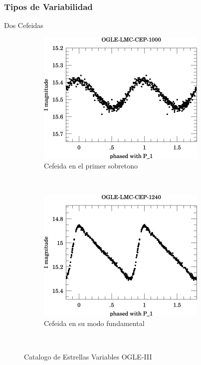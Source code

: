 \documentclass{beamer}
\begin{document}
\begin{frame}
  \frametitle{Tipos de Variabilidad}
  Dos Cefeidas
  \begin{figure}
    \centering
    \begin{subfigure}[b]{0.4\textwidth}
      \includegraphics[width=\textwidth]{./img/OGLE-LMC-CEP-1000_1.jpg}
      \caption{Cefeida en el primer sobretono}
      \label{fig:gull}
    \end{subfigure}%
    ~ %
    \begin{subfigure}[b]{0.4\textwidth}
      \includegraphics[width=\textwidth]{./img/OGLE-LMC-CEP-1240_1.jpg}
      \caption{Cefeida en su modo fundamental}
      \label{fig:tiger}
    \end{subfigure}
    ~ %
    \caption{Catalogo de Estrellas Variables OGLE-III}\label{fig:animals}
  \end{figure}
\end{frame}
\end{document}

